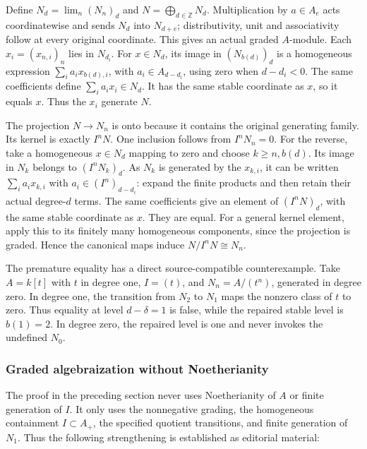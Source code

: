 Define \(N_d=\lim_n(N_n)_d\) and \(N=\bigoplus_{d\in\mathbb Z}N_d\). Multiplication by \(a\in A_e\) acts coordinatewise and sends \(N_d\) into \(N_{d+e}\); distributivity, unit and associativity follow at every original coordinate. This gives an actual graded \(A\)-module. Each \(x_i=(x_{n,i})_n\) lies in \(N_{d_i}\). For \(x\in N_d\), its image in \((N_{b(d)})_d\) is a homogeneous expression \(\sum_i a_ix_{b(d),i}\), with \(a_i\in A_{d-d_i}\), using zero when \(d-d_i<0\). The same coefficients define \(\sum_i a_ix_i\in N_d\). It has the same stable coordinate as \(x\), so it equals \(x\). Thus the \(x_i\) generate \(N\).

The projection \(N\to N_n\) is onto because it contains the original generating family. Its kernel is exactly \(I^nN\). One inclusion follows from \(I^nN_n=0\). For the reverse, take a homogeneous \(x\in N_d\) mapping to zero and choose \(k\geq n,b(d)\). Its image in \(N_k\) belongs to \((I^nN_k)_d\). As \(N_k\) is generated by the \(x_{k,i}\), it can be written \(\sum_i a_ix_{k,i}\) with \(a_i\in (I^n)_{d-d_i}\): expand the finite products and then retain their actual degree-\(d\) terms. The same coefficients give an element of \((I^nN)_d\), with the same stable coordinate as \(x\). They are equal. For a general kernel element, apply this to its finitely many homogeneous components, since the projection is graded. Hence the canonical maps induce \(N/I^nN\cong N_n\).

The premature equality has a direct source-compatible counterexample. Take \(A=k[t]\) with \(t\) in degree one, \(I=(t)\), and \(N_n=A/(t^n)\), generated in degree zero. In degree one, the transition from \(N_2\) to \(N_1\) maps the nonzero class of \(t\) to zero. Thus equality at level \(d-\delta=1\) is false, while the repaired stable level is \(b(1)=2\). In degree zero, the repaired level is one and never invokes the undefined \(N_0\).

\subsubsection{Graded algebraization without Noetherianity}\label{algebra-proof-015-graded-algebraization-without-noetherianity}

The proof in the preceding section never uses Noetherianity of \(A\) or finite generation of \(I\). It only uses the nonnegative grading, the homogeneous containment \(I\subset A_+\), the specified quotient transitions, and finite generation of \(N_1\). Thus the following strengthening is established as editorial material:

